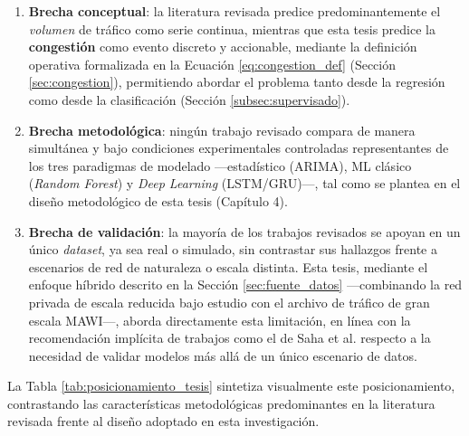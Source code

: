 \documentclass[12pt]{report}
\begin{document}
\begin{enumerate}
    \item \textbf{Brecha conceptual}: la literatura revisada predice predominantemente el \textit{volumen} de tráfico como serie continua, mientras que esta tesis predice la \textbf{congestión} como evento discreto y accionable, mediante la definición operativa formalizada en la Ecuación \ref{eq:congestion_def} (Sección \ref{sec:congestion}), permitiendo abordar el problema tanto desde la regresión como desde la clasificación (Sección \ref{subsec:supervisado}).
    \item \textbf{Brecha metodológica}: ningún trabajo revisado compara de manera simultánea y bajo condiciones experimentales controladas representantes de los tres paradigmas de modelado ---estadístico (ARIMA), ML clásico (\textit{Random Forest}) y \textit{Deep Learning} (LSTM/GRU)---, tal como se plantea en el diseño metodológico de esta tesis (Capítulo 4).
    \item \textbf{Brecha de validación}: la mayoría de los trabajos revisados se apoyan en un único \textit{dataset}, ya sea real o simulado, sin contrastar sus hallazgos frente a escenarios de red de naturaleza o escala distinta. Esta tesis, mediante el enfoque híbrido descrito en la Sección \ref{sec:fuente_datos} ---combinando la red privada de escala reducida bajo estudio con el archivo de tráfico de gran escala MAWI---, aborda directamente esta limitación, 
    en línea con la recomendación implícita de trabajos como el de Saha et al. \cite{saha2024} respecto a la necesidad de validar modelos más allá de un único escenario de datos.
\end{enumerate}

La Tabla \ref{tab:posicionamiento_tesis} sintetiza visualmente este posicionamiento, contrastando las características metodológicas predominantes en la literatura revisada frente al diseño adoptado en esta investigación.
\end{document}
